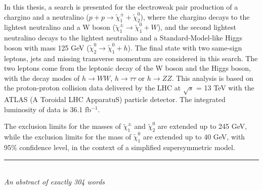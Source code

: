 In this thesis, a search is presented for the electroweak pair production of a chargino and a neutralino ($p + p \rightarrow \tilde{\chi}_1^\pm + \tilde{\chi}_2^0$),
where the chargino decays to the lightest neutralino and a W boson ($\tilde{\chi}_1^\pm \rightarrow \tilde{\chi}_1^0 + W$),
and the second lightest neutralino decays to the lightest neutralino and a Standard-Model-like Higgs boson with mass 125 GeV ($\tilde{\chi}_2^0 \rightarrow \tilde{\chi}_1^0 + h$).
The final state with two same-sign leptons, jets and missing transverse momentum are considered in this search.
The two leptons come from the leptonic decay of the W boson and the Higgs boson, with the decay modes of  $h \rightarrow WW$, $h \rightarrow \tau \tau$ or $h \rightarrow ZZ$.
This analysis is based on the proton-proton collision data delivered by the LHC at $\sqrt{s}$ = 13 TeV with the ATLAS (A Toroidal LHC ApparatuS) particle detector.
The integrated luminosity of data is 36.1 fb$^{-1}$.

The exclusion limits for the masses of $\tilde{\chi}_1^\pm$ and $\tilde{\chi}_2^0$ are extended up to 245 GeV, while the exclusion limits for the mass of $\tilde{\chi}_1^0$ are extended up to 40 GeV, with 95\% confidence level, in the context of a simplified supersymmetric model.

\bigskip

\begin{center}

\rule{6cm}{0.025cm}\\
{\slshape An abstract of exactly 304 words}

\end{center}
